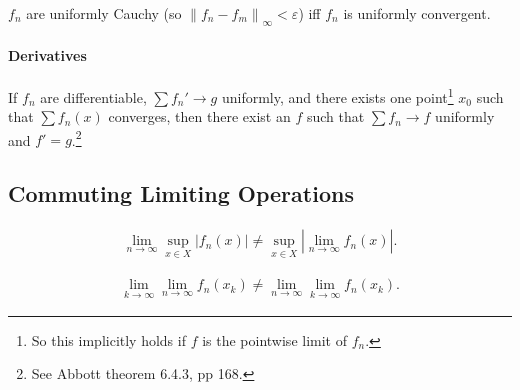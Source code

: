 \begin{proposition}

\(f_n\) are uniformly Cauchy (so
\({\left\lVert {f_n - f_m} \right\rVert}_\infty < {\varepsilon}\)) iff
\(f_n\) is uniformly convergent.

\end{proposition}

\hypertarget{derivatives}{%
\paragraph{Derivatives}\label{derivatives}}

\begin{theorem}

If \(f_n\) are differentiable, \(\sum f_n' \to g\) uniformly, and there
exists one point\footnote{So this implicitly holds if \(f\) is the
  pointwise limit of \(f_n\).} \(x_0\) such that \(\sum f_n(x)\)
converges, then there exist an \(f\) such that \(\sum f_n \to f\)
uniformly and \(f' = g\).\footnote{See Abbott theorem 6.4.3, pp 168.}

\end{theorem}

\hypertarget{commuting-limiting-operations}{%
\subsection{Commuting Limiting
Operations}\label{commuting-limiting-operations}}

\begin{proposition}

\begin{align*}  
\lim_{n\to \infty}\sup_{x\in X} {\left\lvert {f_n(x) } \right\rvert} \neq \sup_{x\in X} {\left\lvert {\lim_{n\to\infty} f_n(x) } \right\rvert}
.\end{align*}

\end{proposition}

\begin{proposition}

\begin{align*}  
\lim_{k\to \infty} \lim_{n\to\infty} f_n(x_k) \neq
\lim_{n\to \infty} \lim_{k\to\infty} f_n(x_k)
.\end{align*}

\end{proposition}

